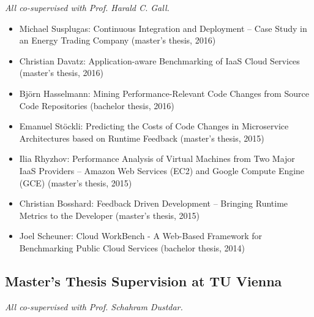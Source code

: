 \documentclass[paper=letter,fontsize=11pt]{scrartcl} %
\begin{document}
\emph{All co-supervised with Prof. Harald C. Gall.}

\begin{itemize}
  \item Michael Susplugas: Continuous Integration and Deployment -- Case Study in an Energy Trading Company (master's thesis, 2016)
	\item Christian Davatz: Application-aware Benchmarking of IaaS Cloud Services (master's thesis, 2016)
	\item Bj\"orn Hasselmann: Mining Performance-Relevant Code Changes from Source Code Repositories (bachelor thesis, 2016)
  \item Emanuel St\"ockli: Predicting the Costs of Code Changes in Microservice Architectures based on Runtime Feedback  (master's thesis, 2015)
  \item Ilia Rhyzhov: Performance Analysis of Virtual Machines from Two Major IaaS Providers -- Amazon Web Services (EC2) and Google Compute Engine (GCE)  (master's thesis, 2015)
  \item Christian Bosshard: Feedback Driven Development -- Bringing Runtime Metrics to the Developer  (master's thesis, 2015)
  \item Joel Scheuner: Cloud WorkBench - A Web-Based Framework for Benchmarking Public Cloud Services (bachelor thesis, 2014)
\end{itemize}

\subsection*{Master's Thesis Supervision at TU Vienna}

\emph{All co-supervised with Prof. Schahram Dustdar.}
\end{document}
